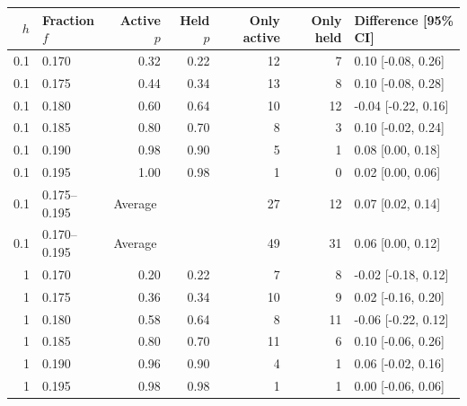 \begin{center}
\begin{minipage}{\linewidth}\centering
\captionsetup{type=table,hypcap=false}
\caption{Majority outcomes with technical traders active and held, paired by starting market, over 50 starting markets and 3,000 post-switch steps. Fractions 0.17 and 0.18 come from the unchanged-resource runs of the trader-resource comparison, which reproduced the dealer-depth runs exactly where the two overlapped. Only active and Only held count markets that reached a majority under one condition alone; held technical traders stayed in Hold from initialization, so paired markets need not share their state at the switch. The difference is active minus held majority probability, with a 95\% interval (CI) from 2,000 bootstrap samples of whole starting markets. Average rows weight the listed fractions equally and count market--fraction pairs.}
\label{tab:feedback-pairs}
\footnotesize\setlength{\tabcolsep}{4pt}
\begin{tabular}{rlrrrrl}
\toprule
$h$ & Fraction $f$ & Active $p$ & Held $p$ & Only active & Only held & Difference [95\% CI] \\
\midrule
0.1 & 0.170 & 0.32 & 0.22 & 12 & 7 & 0.10 [-0.08, 0.26] \\
0.1 & 0.175 & 0.44 & 0.34 & 13 & 8 & 0.10 [-0.08, 0.28] \\
0.1 & 0.180 & 0.60 & 0.64 & 10 & 12 & -0.04 [-0.22, 0.16] \\
0.1 & 0.185 & 0.80 & 0.70 & 8 & 3 & 0.10 [-0.02, 0.24] \\
0.1 & 0.190 & 0.98 & 0.90 & 5 & 1 & 0.08 [0.00, 0.18] \\
0.1 & 0.195 & 1.00 & 0.98 & 1 & 0 & 0.02 [0.00, 0.06] \\
0.1 & 0.175--0.195 & \multicolumn{2}{l}{Average} & 27 & 12 & 0.07 [0.02, 0.14] \\
0.1 & 0.170--0.195 & \multicolumn{2}{l}{Average} & 49 & 31 & 0.06 [0.00, 0.12] \\
\midrule
1 & 0.170 & 0.20 & 0.22 & 7 & 8 & -0.02 [-0.18, 0.12] \\
1 & 0.175 & 0.36 & 0.34 & 10 & 9 & 0.02 [-0.16, 0.20] \\
1 & 0.180 & 0.58 & 0.64 & 8 & 11 & -0.06 [-0.22, 0.12] \\
1 & 0.185 & 0.80 & 0.70 & 11 & 6 & 0.10 [-0.06, 0.26] \\
1 & 0.190 & 0.96 & 0.90 & 4 & 1 & 0.06 [-0.02, 0.16] \\
1 & 0.195 & 0.98 & 0.98 & 1 & 1 & 0.00 [-0.06, 0.06] \\

\end{tabular}
\end{minipage}
\end{center}
